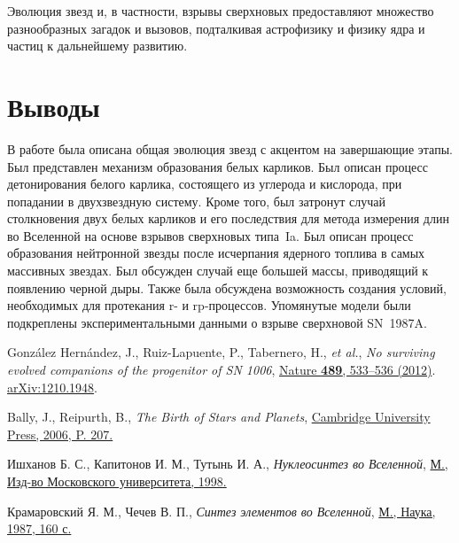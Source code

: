 \documentclass[a4paper, 14pt]{extarticle}
\begin{document}
Эволюция звезд и, в частности, взрывы сверхновых предоставляют множество 
разнообразных загадок и вызовов, подталкивая астрофизику и физику ядра 
и частиц к дальнейшему развитию.


\section{Выводы}

В работе была описана общая эволюция звезд с акцентом на завершающие 
этапы. Был представлен механизм образования белых карликов. Был описан 
процесс детонирования белого карлика, состоящего из углерода 
и кислорода, при попадании в двухзвездную систему. Кроме того, был 
затронут случай столкновения двух белых карликов и его последствия для 
метода измерения длин во Вселенной на основе взрывов сверхновых типа~Ia. 
Был описан процесс образования нейтронной звезды после исчерпания 
ядерного топлива в самых массивных звездах. Был обсужден случай еще 
большей массы, приводящий к появлению черной дыры. Также была обсуждена 
возможность создания условий, необходимых для протекания r- 
и rp-процессов.
%
Упомянутые модели были подкреплены экспериментальными данными о взрыве 
сверхновой SN~1987A.


{}
\begin{thebibliography}{9}
		González Hernández, J., Ruiz-Lapuente, P., Tabernero, H.,
		\textit{et al.},
		\textit{No surviving evolved companions of the progenitor of SN 1006},
		\href{https://doi.org/10.1038/nature11447}
		{Nature \textbf{489}, 533–536 (2012)}.
		\href{https://arxiv.org/abs/1210.1948}{arXiv:1210.1948}.

		Bally, J., Reipurth, B.,
		\textit{The Birth of Stars and Planets},
		\href{https://books.google.com/books?id=Pwy9OtT8u6QC&pg=PA207}
		{Cambridge University Press, 2006, P. 207.}

		Ишханов Б. С., Капитонов И. М., Тутынь И. А.,
		\textit{Нуклеосинтез во Вселенной},
		\href{http://nuclphys.sinp.msu.ru/nuclsynt/index.html}
		{М., Изд-во Московского университета, 1998.}

		Крамаровский Я. М., Чечев В. П.,
		\textit{Синтез элементов во Вселенной},
		\href{http://nuclphys.sinp.msu.ru/books/astro/%D0%9A%D1%80%D0%B0%D0%BC%D0%B0%D1%80%D0%BE%D0%B2%D1%81%D0%BA%D0%B8%D0%B9_%D0%A7%D0%B5%D1%87%D0%B5%D0%B2.pdf}
		{М., Наука, 1987, 160 с.}
\end{thebibliography}
\end{document}
